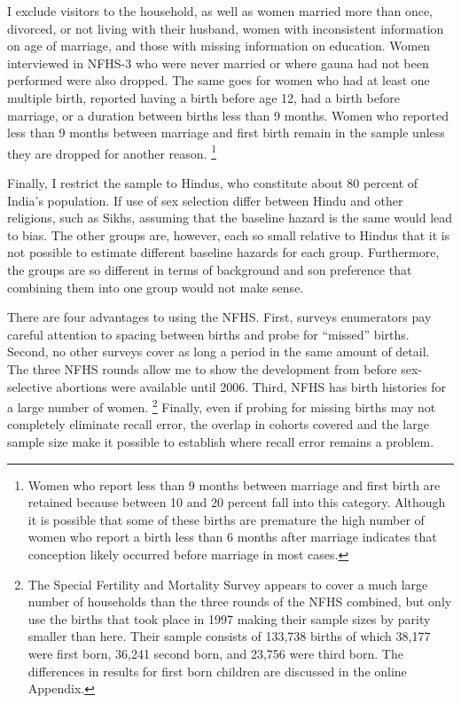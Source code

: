 \documentclass[12pt,letterpaper]{article}
\begin{document}
I exclude visitors to the household, as well as
women married more than once, divorced, or not living with their husband,
women with inconsistent information on age of marriage,
and those with missing information on education.
Women interviewed in NFHS-3 who were never married or where gauna had not
been performed were also dropped.
The same goes for women who had at least one multiple birth,
reported having a birth before age 12, had a birth before marriage, or
a duration between births less than 9 months.
Women who reported less than 9 months between marriage and first birth
remain in the sample unless they are dropped for another reason.%
\footnote{
Women who report less than 9 months between marriage and first birth are retained 
because between 10 and 20 percent fall into this category.
Although it is possible that some of these births are premature the high number of
women who report a birth less than 6 months after marriage indicates that conception
likely occurred before marriage in most cases.
}

Finally, I restrict the sample to Hindus,
who constitute about 80 percent of India's population.
If use of sex selection differ between Hindu and other religions, such 
as Sikhs, assuming that the baseline hazard is the same would lead to bias.
The other groups are, however, each so small relative to Hindus that it is not
possible to estimate different baseline hazards for each group.
Furthermore, the groups are so different in terms of background and son preference
that combining them into one group would not make sense.

There are four advantages to using the NFHS.
First, surveys enumerators pay careful attention to spacing between births and
probe for ``missed'' births.
Second, no other surveys cover as long a period in the same amount of detail.
The three NFHS rounds allow me to show the development from before sex-selective 
abortions were available until 2006.
Third, NFHS has birth histories for a large number of women.%
\footnote{
The Special Fertility and Mortality Survey appears to cover a much large number of households
than the three rounds of the NFHS combined, but \citet{jha06} only use the births that 
took place in 1997 making their sample sizes by parity smaller than here.
Their sample consists of 133,738 births of which 38,177 were first
born, 36,241 second born, and 23,756 were third born.
The differences in results for first born children are discussed in the online 
Appendix.
}
Finally, even if probing for missing births may not completely eliminate recall error,   
the overlap in cohorts covered and the large sample size make it possible to establish 
where recall error remains a problem.
\end{document}
